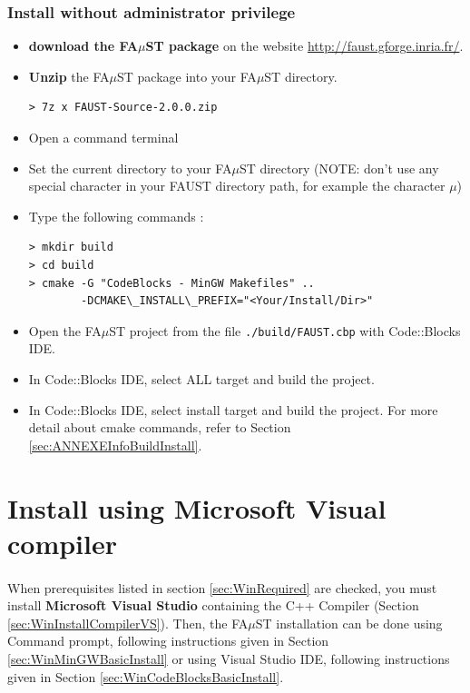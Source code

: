 \subsubsection{Install without administrator privilege}
\label{sec:WinMinGWCodeBlocksNoAdminBasicInstall}
\begin{itemize}
\item \textbf{download the FA$\mu$ST package} on the website  \url{http://faust.gforge.inria.fr/}. 
\item \textbf{Unzip} the FA$\mu$ST package into your FA$\mu$ST directory. 
\begin{lstlisting}
> 7z x FAUST-Source-2.0.0.zip
\end{lstlisting}
\item Open a command terminal
\item Set the current directory to your FA$\mu$ST directory (NOTE: don't use any special character in your FAUST directory path, for example the character $\mu$)
\item Type the following commands : 
\begin{lstlisting}
> mkdir build
> cd build
> cmake -G "CodeBlocks - MinGW Makefiles" .. 
	    -DCMAKE\_INSTALL\_PREFIX="<Your/Install/Dir>"
\end{lstlisting}
\item Open the FA$\mu$ST project from the file \texttt{./build/FAUST.cbp} with Code::Blocks IDE.
\item In Code::Blocks IDE, select ALL target and build the project.
\item In Code::Blocks IDE, select install target and build the project.
For more detail about cmake commands, refer to Section \ref{sec:ANNEXEInfoBuildInstall}.
\end{itemize}





\section{Install using Microsoft Visual compiler}\label{sec:WinInstallVS}

\paragraph{}When prerequisites listed in section \ref{sec:WinRequired} are checked, you must install \textbf{Microsoft Visual Studio} containing the C++ Compiler (Section \ref{sec:WinInstallCompilerVS}).
Then, the FA$\mu$ST installation can be done using Command prompt, following instructions given in Section \ref{sec:WinMinGWBasicInstall} or using Visual Studio IDE, following instructions given in Section \ref{sec:WinCodeBlocksBasicInstall}. 



